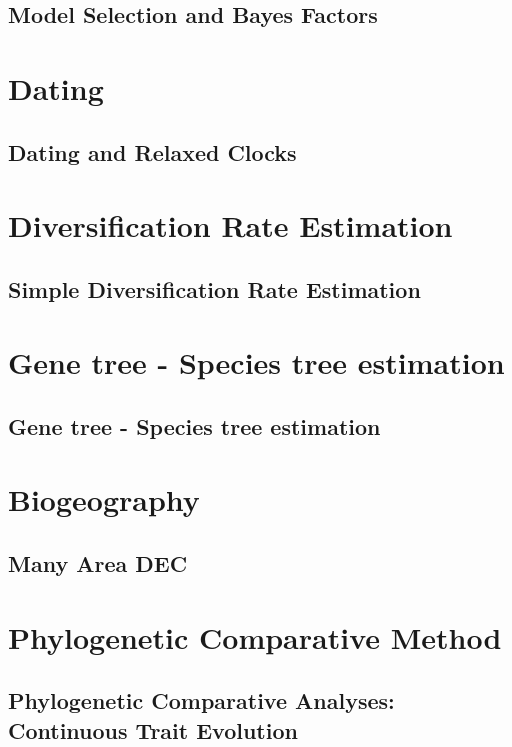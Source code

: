 \documentclass[11pt]{book}
\begin{document}
\chapter{Model Selection and Bayes Factors}


\part{Dating}
\chapter{Dating and Relaxed Clocks}


\part{Diversification Rate Estimation}
\chapter{Simple Diversification Rate Estimation}



\part{Gene tree - Species tree estimation}
\chapter{Gene tree - Species tree estimation}


\part{Biogeography}
\chapter{Many Area DEC}



\part{Phylogenetic Comparative Method}
\chapter{Phylogenetic Comparative Analyses: Continuous Trait Evolution}

\end{document}
